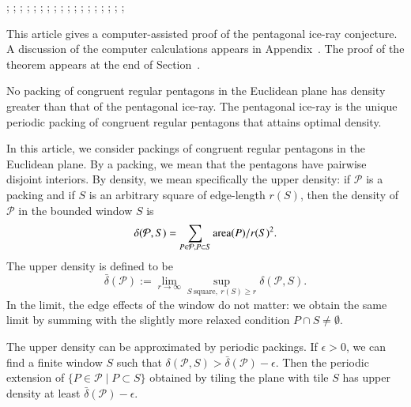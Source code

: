 {
;  %
;  %
;  
;  %
; 
;  
;  
;  %
; 
;  
;  
;  %
;  %
; 
;  %
; 
;  
;   
}

This article gives a computer-assisted proof of the pentagonal ice-ray
conjecture.  A discussion of the computer calculations appears in
Appendix~.
The proof of the theorem appears at the end of Section~.

\begin{theorem}  
  No packing of congruent regular pentagons in the Euclidean plane has
  density greater than that of the pentagonal ice-ray.  The pentagonal
  ice-ray is the unique periodic packing of congruent regular
  pentagons that attains optimal density.
\end{theorem}

In this article, we consider packings of congruent regular pentagons
in the Euclidean plane.  By a packing, we mean that the pentagons have
pairwise disjoint interiors.  By density, we mean specifically the
upper density: if ${\mathcal P}$ is a packing and if $S$ is an arbitrary square
of edge-length $r(S)$, then the density of $\mathcal P$ in the bounded
window $S$ is
\[
\delta({\mathcal P},S) = \sum_{P\in {\mathcal P},P\subset S}{{\operatorname{area}}(P)}/{r(S)^2}.
\]
The upper density is defined to be
\[
\bar\delta({\mathcal P}):=\lim_{r\to\infty}
\sup_{S~\text{square},~r(S)\ge r}\delta({\mathcal P},S).
\]
In the limit, the edge effects of the window do not matter:  we obtain
the same limit by summing with the slightly more relaxed condition
$P\cap S\ne\emptyset$.

The upper density can be approximated by periodic packings.  If
$\epsilon >0$, we can find a finite window $S$ such that
$\delta({\mathcal P},S)>\bar\delta({\mathcal P})-\epsilon$.  Then the
periodic extension of $\{P\in {\mathcal P}\mid P\subset S\}$ obtained
by tiling the plane with tile $S$ has upper density at least
$\bar\delta({\mathcal P})-\epsilon$.

